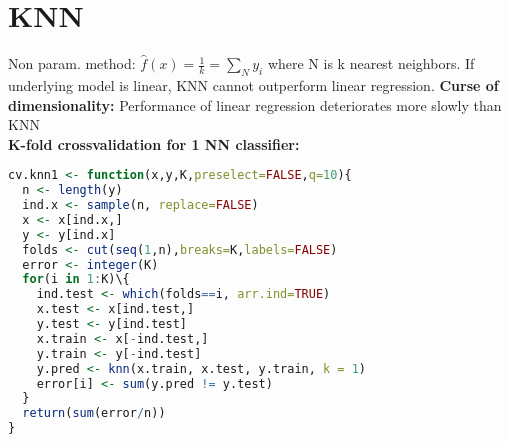 \section{KNN}
Non param. method: $\hat f(x) = \frac{1}{k} = \sum_N y_i$ where N is k nearest neighbors. If underlying model is linear, KNN cannot outperform linear regression.
\textbf{Curse of dimensionality: } Performance of linear regression deteriorates more slowly than KNN \\
\textbf{K-fold crossvalidation for 1 NN classifier: }
\begin{lstlisting}[language = R]
cv.knn1 <- function(x,y,K,preselect=FALSE,q=10){
  n <- length(y)
  ind.x <- sample(n, replace=FALSE)
  x <- x[ind.x,]
  y <- y[ind.x]
  folds <- cut(seq(1,n),breaks=K,labels=FALSE)
  error <- integer(K)
  for(i in 1:K)\{
    ind.test <- which(folds==i, arr.ind=TRUE)
    x.test <- x[ind.test,]
    y.test <- y[ind.test]
    x.train <- x[-ind.test,]
    y.train <- y[-ind.test]
    y.pred <- knn(x.train, x.test, y.train, k = 1)  
    error[i] <- sum(y.pred != y.test)
  }
  return(sum(error/n))
}
\end{lstlisting}